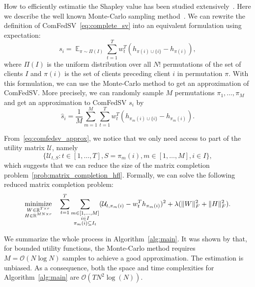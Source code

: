 How to efficiently estimatie the Shapley value has been studied extensively~\citep{ghorbani2019data,jia2019towards}. Here we describe the well known Monte-Carlo sampling method~\citep{metropolis1949monte, ghorbani2019data}. We can rewrite the definition of ComFedSV~\eqref{eq:complete_sv} into an equivalent formulation using expectation:
\begin{equation} 
    s_i = \mathop{\mathbb{E}}_{\pi \sim \Pi(I)} \sum_{t=1}^T w_t^T\left(h_{ \pi(i) \cup \{i\}}  - h_{ \pi(i) }\right),
\end{equation}
where $\Pi(I)$ is the uniform distribution over all $N!$ permutations of the set of clients $I$ and $\pi(i)$ is the set of clients preceding client $i$ in permutation $\pi$. With this formulation, we can use the Monte-Carlo method to get an approximation of ComFedSV. More precisely, we can randomly sample $M$ permutations $\pi_1, \dots, \pi_M$ and get an approximation to ComFedSV $s_i$ by 
\begin{equation} \label{eq:comfedsv_approx}
    \hat s_i = \frac{1}{M}\sum_{m=1}^M \sum_{t=1}^T w_t^T\left(h_{ \pi_m(i) \cup \{i\}}  - h_{ \pi_m(i) }\right).
\end{equation}

From~\eqref{eq:comfedsv_approx}, we notice that we only need access to part of the utility matrix $\mathcal{U}$, namely 
\[ \{\mathcal{U}_{t, S}: t \in [1, \dots, T], S = \pi_m(i), m \in [1,\dots,M], i \in I\}, \]
which suggests that we can reduce the size of the matrix completion problem~\eqref{prob:matrix_completion_hfl}. Formally, we can solve the following reduced matrix completion problem:
\begin{equation}
\label{prob:matrix_completion_reduced}
\displaystyle\mathop{\hbox{\rm minimize}}_{\substack{W \in \mathbb{R}^{T \times r}\\ H \in \mathbb{R}^{MN \times r}}}\enspace\enspace \sum_{t=1}^T\sum_{ \substack{m \in [1,\dots, M] \\ i \in I \\ \pi_m(i) \subseteq I_t  } } (\mathcal{U}_{t,\pi_m(i)} - w_t^Th_{\pi_m(i)})^2 + \lambda(\|W\|_F^2 + \|H\|_F^2).
\end{equation}

We summarize the whole process in Algorithm~\ref{alg:main}. It was shown by \citet{maleki2013bounding} that, for bounded utility functions, the Monte-Carlo method requires $M = \mathcal{O}(N\log N)$ samples to achieve a good approximation.  The estimation is unbiased. As a consequence, both the space and time complexities for Algorithm~\ref{alg:main} are $\mathcal{O}(TN^2\log(N))$. 

